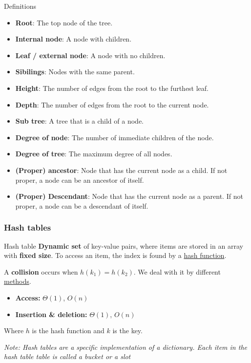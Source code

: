 \begin{knBox}
    {Definitions}
    \begin{itemize}
        \item \textbf{Root}: The top node of the tree.
        \item \textbf{Internal node}: A node with children.
        \item \textbf{Leaf / external node}: A node with no children.
        \item \textbf{Sibilings}: Nodes with the same parent.
        \item \textbf{Height}: The number of edges from the root to the furthest leaf.
        \item \textbf{Depth}: The number of edges from the root to the current node.
              \item\textbf{Sub tree}: A tree that is a child of a node.
        \item \textbf{Degree of node}: The number of immediate children of the node.
        \item \textbf{Degree of tree}: The maximum degree of all nodes.
        \item \textbf{(Proper) ancestor}: Node that has the current node as a child. If not proper, a node can be an ancestor of itself.
        \item \textbf{(Proper) Descendant}: Node that has the current node as a parent. If not proper, a node can be a descendant of itself.
    \end{itemize}
\end{knBox}

\subsubsection{Hash tables}

\begin{definition}
    {Hash table}
    \textbf{Dynamic set} of key-value pairs, where items are stored in an array with \textbf{fixed size}. To access an item, the index is found by a \hyperref[thm:hash-function]{hash function}.

    A \textbf{collision} occurs when $h(k_1) = h(k_2)$. We deal with it by different \hyperref[thm:collision-resolution]{methods}.

    \begin{itemize}
        \item \textbf{Access:} $\Theta(1)$, $O(n)$
        \item \textbf{Insertion \& deletion:} $\Theta(1)$, $O(n)$
    \end{itemize}

    Where $h$ is the hash function and $k$ is the key.

    \textit{Note: Hash tables are a specific implementation of a dictionary. Each item in the hash table table is called a bucket or a slot}
\end{definition}

